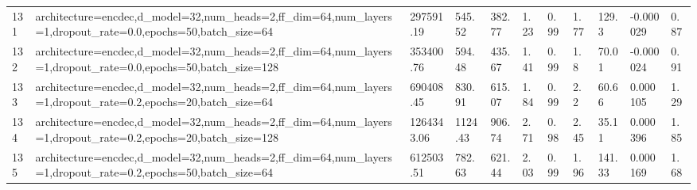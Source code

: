 \begin{longtable}{C{0.8cm} L{2cm} C{1.15cm} C{1.15cm} C{1.15cm} C{1.15cm} C{0.85cm} C{1.25cm} C{1.2cm} C{1.5cm} C{1.0cm}}
131 & architecture=encdec,\newline d\_model=32,\newline num\_heads=2,\newline ff\_dim=64,\newline num\_layers=1,\newline dropout\_rate=0.0,\newline epochs=50,\newline batch\_size=64 & 297591.19 & 545.52 & 382.77 & 1.23 & 0.99 & 1.77 & 129.3 & -0.000029 & 0.87 \\
132 & architecture=encdec,\newline d\_model=32,\newline num\_heads=2,\newline ff\_dim=64,\newline num\_layers=1,\newline dropout\_rate=0.0,\newline epochs=50,\newline batch\_size=128 & 353400.76 & 594.48 & 435.67 & 1.41 & 0.99 & 1.8 & 70.01 & -0.000024 & 0.91 \\
133 & architecture=encdec,\newline d\_model=32,\newline num\_heads=2,\newline ff\_dim=64,\newline num\_layers=1,\newline dropout\_rate=0.2,\newline epochs=20,\newline batch\_size=64 & 690408.45 & 830.91 & 615.07 & 1.84 & 0.99 & 2.2 & 60.66 & 0.000105 & 1.29 \\
134 & architecture=encdec,\newline d\_model=32,\newline num\_heads=2,\newline ff\_dim=64,\newline num\_layers=1,\newline dropout\_rate=0.2,\newline epochs=20,\newline batch\_size=128 & 1264343.06 & 1124.43 & 906.74 & 2.71 & 0.98 & 2.45 & 35.11 & 0.000396 & 1.85 \\
135 & architecture=encdec,\newline d\_model=32,\newline num\_heads=2,\newline ff\_dim=64,\newline num\_layers=1,\newline dropout\_rate=0.2,\newline epochs=50,\newline batch\_size=64 & 612503.51 & 782.63 & 621.44 & 2.03 & 0.99 & 1.96 & 141.33 & 0.000169 & 1.68 \\

\end{longtable}
